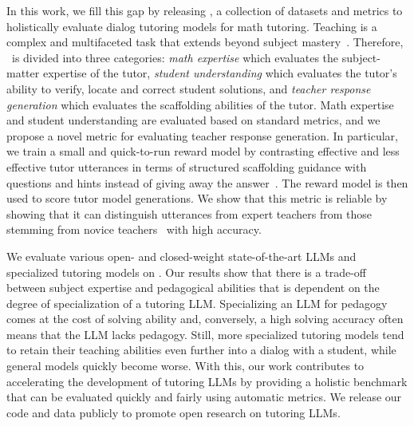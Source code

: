 In this work, we fill this gap by releasing \mathtutorbench, a collection of datasets and metrics to holistically evaluate dialog tutoring models for math tutoring. Teaching is a complex and multifaceted task that extends beyond subject mastery~\cite{nye2014autotutor,beasharedtask2023,bridge24}.
Therefore, \mathtutorbench\ is divided into three categories: \emph{math expertise} which evaluates the subject-matter expertise of the tutor, \emph{student understanding} which evaluates the tutor's ability to verify, locate and correct student solutions, and \emph{teacher response generation} which evaluates the scaffolding abilities of the tutor.
Math expertise and student understanding are evaluated based on standard metrics, and we propose a novel metric for evaluating teacher response generation.
In particular, we train a small and quick-to-run reward model by contrasting effective and less effective tutor utterances in terms of structured scaffolding guidance with questions and hints instead of giving away the answer~\citep{anghileri2006scaffolding}. 
The reward model is then used to score tutor model generations. 
We show that this metric is reliable by showing that it can distinguish utterances from expert teachers from those stemming from novice teachers~\citep{bridge24} with high accuracy.

We evaluate various open- and closed-weight state-of-the-art LLMs and specialized tutoring models on \mathtutorbench.
Our results show that there is a trade-off between subject expertise and pedagogical abilities that is dependent on the degree of specialization of a tutoring LLM.
Specializing an LLM for pedagogy comes at the cost of solving ability and, conversely, a high solving accuracy often means that the LLM lacks pedagogy.
Still, more specialized tutoring models tend to retain their teaching abilities even further into a dialog with a student, while general models quickly become worse.
With this, our work contributes to accelerating the development of tutoring LLMs by providing a holistic benchmark that can be evaluated quickly and fairly using automatic metrics.
We release our code and data publicly to promote open research on tutoring LLMs.

